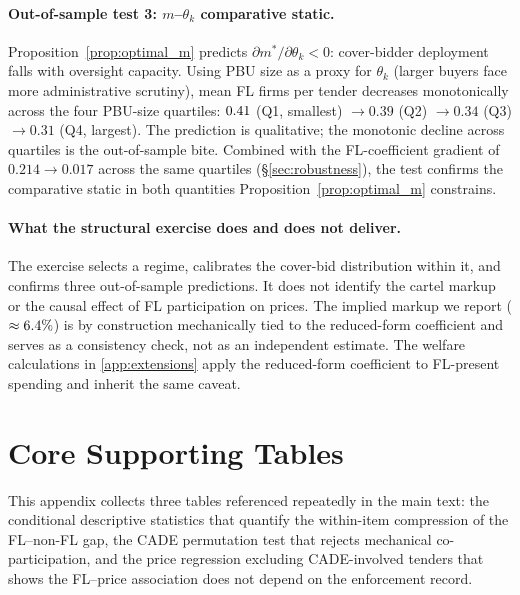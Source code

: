 \paragraph{Out-of-sample test 3: $m$--$\theta_k$ comparative
static.}
Proposition~\ref{prop:optimal_m} predicts $\partial m^* /
\partial \theta_k < 0$: cover-bidder deployment falls with
oversight capacity. Using PBU size as a proxy for $\theta_k$
(larger buyers face more administrative scrutiny), mean FL
firms per tender decreases monotonically across the four
PBU-size quartiles: $0.41$ (Q1, smallest) $\to 0.39$ (Q2) $\to
0.34$ (Q3) $\to 0.31$ (Q4, largest). The prediction is
qualitative; the monotonic decline across quartiles is the
out-of-sample bite. Combined with the FL-coefficient gradient
of $0.214 \to 0.017$ across the same quartiles
(\S\ref{sec:robustness}), the test confirms the comparative
static in both quantities Proposition~\ref{prop:optimal_m}
constrains.

\paragraph{What the structural exercise does and does not deliver.}
The exercise selects a regime, calibrates the cover-bid
distribution within it, and confirms three out-of-sample
predictions. It does not identify the cartel markup or the
causal effect of FL participation on prices. The implied
markup we report ($\approx 6.4\%$) is by construction
mechanically tied to the reduced-form coefficient and serves
as a consistency check, not as an independent estimate. The
welfare calculations in \ref{app:extensions} apply the
reduced-form coefficient to FL-present spending and inherit the
same caveat.


\section{Core Supporting Tables}
\label{app:competition}

This appendix collects three tables referenced repeatedly in
the main text: the conditional descriptive statistics that
quantify the within-item compression of the FL--non-FL gap, the
CADE permutation test that rejects mechanical co-participation,
and the price regression excluding CADE-involved tenders that
shows the FL--price association does not depend on the
enforcement record.

